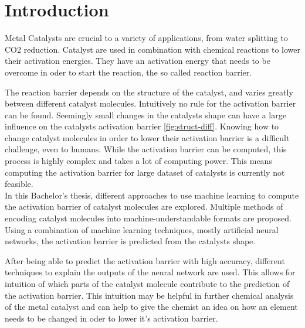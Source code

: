 
\chapter{Introduction}
\label{ch:Introduction}


Metal Catalysts are crucial to a variety of applications, from water splitting to CO2 reduction.
Catalyst are used in combination with chemical reactions to lower their activation energies.
They have an activation energy that needs to be overcome in oder to start the reaction, the so called reaction barrier.

The reaction barrier depends on the structure of the catalyst, and varies greatly between different catalyst molecules.
Intuitively no rule for the activation barrier can be found.
Seemingly small changes in the catalysts shape can have a large influence on the catalysts activation barrier \ref{fig:struct-diff}.
Knowing how to change catalyst molecules in order to lower their activation barrier is a difficult challenge, even to humans.
While the activation barrier can be computed, this process is highly complex and takes a lot of computing power.
This means computing the activation barrier for large dataset of catalysts is currently not feasible.
\\
In this Bachelor's thesis, different approaches to use machine learning to compute the activation barrier of catalyst molecules are explored.
Multiple methods of encoding catalyst molecules into machine-understandable formats are proposed.
Using a combination of machine learning techniques, mostly artificial neural networks, the activation barrier is predicted from the catalysts shape.

After being able to predict the activation barrier with high accuracy, different techniques to explain the 
outputs of the neural network are used.
This allows for intuition of which parts of the catalyst molecule contribute to the prediction of the activation barrier.
This intuition may be helpful in further chemical analysis of the metal catalyst and can help to give the 
chemist an idea on how an element needs to be changed in oder to lower it's activation barrier.
\\

